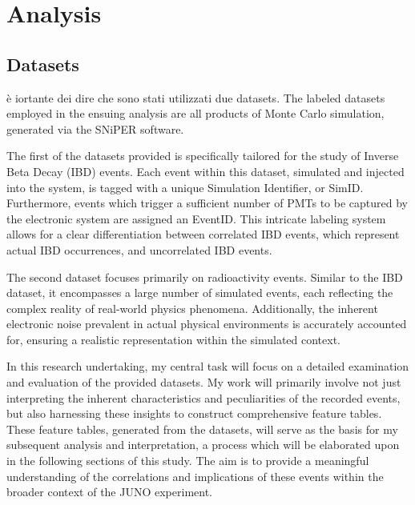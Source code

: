 \chapter{Analysis}

\section{Datasets}
è iortante dei dire che sono stati utilizzati due datasets.
The labeled datasets employed in the ensuing analysis are all products of Monte Carlo simulation, generated via the SNiPER software.

The first of the datasets provided is specifically tailored for the study of Inverse Beta Decay (IBD) events. Each event within this dataset, simulated and injected into the system, is tagged with a unique Simulation Identifier, or SimID. Furthermore, events which trigger a sufficient number of PMTs to be captured by the electronic system are assigned an EventID. This intricate labeling system allows for a clear differentiation between correlated IBD events, which represent actual IBD occurrences, and uncorrelated IBD events.


The second dataset focuses primarily on radioactivity events. Similar to the IBD dataset, it encompasses a large number of simulated events, each reflecting the complex reality of real-world physics phenomena. Additionally, the inherent electronic noise prevalent in actual physical environments is accurately accounted for, ensuring a realistic representation within the simulated context.

In this research undertaking, my central task will focus on a detailed examination and evaluation of the provided datasets. My work will primarily involve not just interpreting the inherent characteristics and peculiarities of the recorded events, but also harnessing these insights to construct comprehensive feature tables. These feature tables, generated from the datasets, will serve as the basis for my subsequent analysis and interpretation, a process which will be elaborated upon in the following sections of this study. The aim is to provide a meaningful understanding of the correlations and implications of these events within the broader context of the JUNO experiment.


